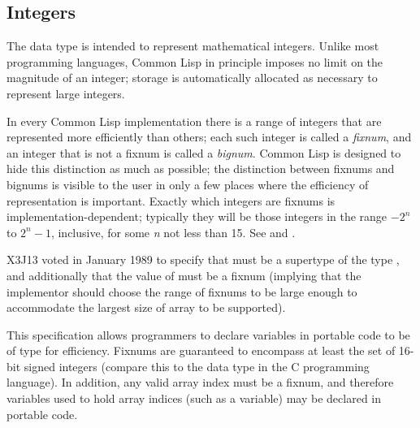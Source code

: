 \subsection{Integers}
\label{INTEGERS-SECTION}

The  data type is intended to represent mathematical integers.
Unlike most programming languages, Common Lisp in principle imposes no limit on
the magnitude of an integer; storage
is automatically allocated as necessary to represent large integers.

In every Common Lisp implementation there is a range of integers that are
represented more efficiently than others; each such integer is called a
\emph{fixnum}, and an integer that is not a fixnum is called a
\emph{bignum}.
Common Lisp is designed to hide this distinction as much as possible;
the distinction between fixnums and bignums is visible to
the user in only a few places where the efficiency of representation is
important.  Exactly which integers are
fixnums is implementation-dependent; typically they will be those
integers in the range $-2^{n}$ to $2^{n}-1$,
inclusive, for some \emph{n} not less than 15.
See  and .

\begin{new}
X3J13 voted in January 1989
to specify that  must be a supertype
of the type , and additionally that the value
of  must be a fixnum (implying that the implementor
should choose the range of fixnums to be large enough to accommodate the
largest size of array to be supported).

\beforenoterule
\begin{rationale}
This specification allows programmers to declare variables in portable code
to be of type  for efficiency.  Fixnums are guaranteed to
encompass at least the set of 16-bit signed integers
(compare this to the data type  in the C programming language).
In addition, any valid array index must be a fixnum, and therefore variables
used to hold array indices (such as a  variable)
may be declared  in portable code.
\end{rationale}
\afternoterule
\end{new}

